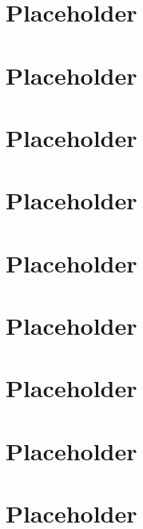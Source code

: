 \documentclass[a4paper]{article}
\begin{document}
  \section{Placeholder} 
  \section{Placeholder} 
  \section{Placeholder} 
  \section{Placeholder} 
  \section{Placeholder} 
  \section{Placeholder} 
  \section{Placeholder} 
  \section{Placeholder} 
  \section{Placeholder} 
\end{document}

